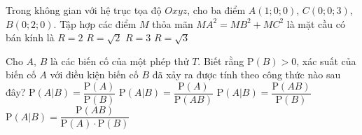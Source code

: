\begin{ex}%
	Trong không gian với hệ trục tọa độ $Oxyz$, cho ba điểm $A(1;0;0)$, $C(0;0;3)$, $B(0;2;0)$. Tập hợp các điểm $M$ thỏa mãn $MA^2=MB^2+MC^2$ là mặt cầu có bán kính là
	\choice
	{$R=2$}
	{\True $R=\sqrt{2}$}
	{$R=3$}
	{$R=\sqrt{3}$}
\end{ex}
\begin{ex}%
	Cho $A$, $B$ là các biến cố của một phép thử $T$. Biết rằng $\mathrm{P}(B)>0$, xác suất của biến cố $A$ với điều kiện biến cố $B$ đã xảy ra được tính theo công thức nào sau đây?
	\choice
	{$\mathrm{P}(A|B)=\dfrac{\mathrm{P}(A)}{\mathrm{P}(B)}$}
	{$\mathrm{P}(A|B)=\dfrac{\mathrm{P}(A)}{\mathrm{P}(A B)}$}
	{\True $\mathrm{P}(A| B)=\dfrac{\mathrm{P}(A B)}{\mathrm{P}(B)}$}
	{$\mathrm{P}(A|B)=\dfrac{\mathrm{P}(A B)}{\mathrm{P}(A) \cdot \mathrm{P}(B)}$}
\end{ex}

